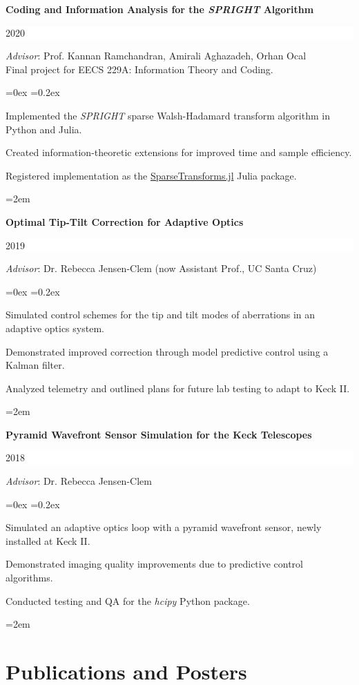 \documentclass[paper=a4,fontsize=12pt]{scrartcl}
\newcommand{\cvlist}{%

    \rightmargin=0in
    \leftmargin=0.15in
    \topsep=0ex
    \partopsep=0pt
    \itemsep=0.2ex 
    \parsep=0pt
    \itemindent=0.0\leftmargin
    \listparindent=3.0\leftmargin
    \settowidth{\labelsep}{~}
    \leftskip=-10.1in
    \parindent=-0.1in
}
\newcommand{\NewPart}[1]{\section*{{#1}}}
\newcommand{\EducationEntry}[4]{
		\noindent \textbf{#1} \hfill      %
		\colorbox{White}{%
			\parbox{5cm}{%
			\hfill\color{Black}#2}} \par  %
		\noindent #3 \par        %
		\noindent\hangindent=2em\hangafter=0 \small #4 %
		\normalsize \par}
\begin{document}
\EducationEntry{Coding and Information Analysis for the \textit{SPRIGHT} Algorithm}{2020}{
\textit{Advisor}: Prof. Kannan Ramchandran, Amirali Aghazadeh, Orhan Ocal\\
Final project for EECS 229A: Information Theory and Coding.
\begin{list}{\textbullet}{\cvlist}
    \item Implemented the \textit{SPRIGHT} sparse Walsh-Hadamard transform algorithm in Python and Julia.
    \item Created information-theoretic extensions for improved time and sample efficiency.
    \item Registered implementation as the {\color{blue}\href{github.com/aditya-sengupta/SparseTransforms.jl}{SparseTransforms.jl}} Julia package.
\end{list}
}
\hfill

\EducationEntry{Optimal Tip-Tilt Correction for Adaptive Optics}{2019}{
\textit{Advisor}: Dr. Rebecca Jensen-Clem (now Assistant Prof., UC Santa Cruz)
\begin{list}{\textbullet}{\cvlist}
\setlength\itemsep{0pt}
\item Simulated control schemes for the tip and tilt modes of aberrations in an adaptive optics system. 
\item Demonstrated improved correction through model predictive control using a Kalman filter.
\item Analyzed telemetry and outlined plans for future lab testing to adapt to Keck II.
\end{list}
}
\hfill

\EducationEntry{Pyramid Wavefront Sensor Simulation for the Keck Telescopes}{2018}{
\textit{Advisor}: Dr. Rebecca Jensen-Clem
\begin{list}{\textbullet}{\cvlist}
\item Simulated an adaptive optics loop with a pyramid wavefront sensor, newly installed at Keck II. 
\item Demonstrated imaging quality improvements due to predictive control algorithms. 
\item Conducted testing and QA for the \textit{hcipy} Python package.
\end{list}
}
\newpage
\NewPart{Publications and Posters}
\end{document}
